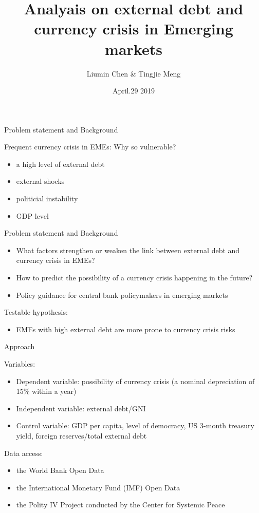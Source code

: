 \documentclass[ignorenonframetext,]{beamer}
\title{Analyais on external debt and currency crisis in Emerging markets}
\author{Liumin Chen \& Tingjie Meng}
\date{April.29 2019}
\providecommand{\tightlist}{%
  \setlength{\itemsep}{0pt}\setlength{\parskip}{0pt}}
\begin{document}
\frame{\titlepage}

\begin{frame}{Problem statement and Background}

Frequent currency crisis in EMEs: Why so vulnerable?

\begin{itemize}
\tightlist
\item
  a high level of external debt
\item
  external shocks
\item
  politicial instability
\item
  GDP level
\end{itemize}

\end{frame}

\begin{frame}{Problem statement and Background}

\begin{itemize}
\tightlist
\item
  What factors strengthen or weaken the link between external debt and
  currency crisis in EMEs?
\item
  How to predict the possibility of a currency crisis happening in the
  future?
\item
  Policy guidance for central bank policymakers in emerging markets
\end{itemize}

Testable hypothesis:

\begin{itemize}
\tightlist
\item
  EMEs with high external debt are more prone to currency crisis risks
\end{itemize}

\end{frame}

\begin{frame}{Approach}

Variables:

\begin{itemize}
\tightlist
\item
  Dependent variable: possibility of currency crisis (a nominal
  depreciation of 15\% within a year)
\item
  Independent variable: external debt/GNI
\item
  Control variable: GDP per capita, level of democracy, US 3-month
  treasury yield, foreign reserves/total external debt
\end{itemize}

Data access:

\begin{itemize}
\tightlist
\item
  the World Bank Open Data
\item
  the International Monetary Fund (IMF) Open Data
\item
  the Polity IV Project conducted by the Center for Systemic Peace
\end{itemize}

\end{frame}
\end{document}
